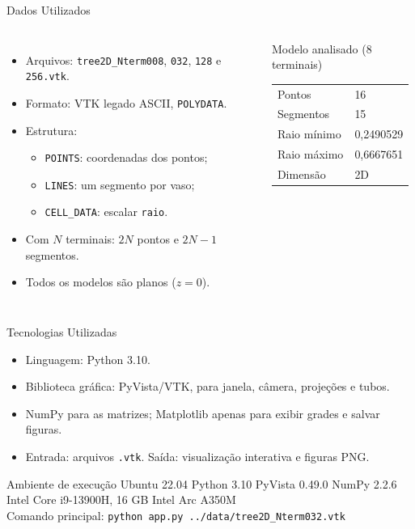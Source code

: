 \documentclass[aspectratio=169,11pt]{beamer}
\begin{document}
\begin{frame}{Dados Utilizados}
\begin{columns}
\begin{itemize}
  \item Arquivos: \texttt{tree2D\_Nterm008}, \texttt{032}, \texttt{128} e \texttt{256}\texttt{.vtk}.
  \item Formato: VTK legado ASCII, \texttt{POLYDATA}.
  \item Estrutura:
  \begin{itemize}
    \item \texttt{POINTS}: coordenadas dos pontos;
    \item \texttt{LINES}: um segmento por vaso;
    \item \texttt{CELL\_DATA}: escalar \texttt{raio}.
  \end{itemize}
  \item Com $N$ terminais: $2N$ pontos e $2N-1$ segmentos.
  \item Todos os modelos são planos ($z=0$).
\end{itemize}

\begin{block}{Modelo analisado (8 terminais)}
\small
\begin{tabular}{ll}
\toprule
Pontos & 16\\
Segmentos & 15\\
Raio mínimo & 0,2490529\\
Raio máximo & 0,6667651\\
Dimensão & 2D\\
\bottomrule
\end{tabular}
\end{block}
\end{columns}
\end{frame}

\begin{frame}{Tecnologias Utilizadas}
\begin{itemize}
  \item Linguagem: Python 3.10.
  \item Biblioteca gráfica: PyVista/VTK, para janela, câmera, projeções e tubos.
  \item NumPy para as matrizes; Matplotlib \alert{apenas} para exibir grades e salvar figuras.
  \item Entrada: arquivos \texttt{.vtk}. Saída: visualização interativa e figuras PNG.
\end{itemize}

\vspace{0.25cm}

\begin{block}{Ambiente de execução}
\small
Ubuntu 22.04 \quad Python 3.10 \quad PyVista 0.49.0 \quad NumPy 2.2.6\\
Intel Core i9-13900H, 16 GB \quad Intel Arc A350M\\[0.1cm]
Comando principal: \texttt{python app.py ../data/tree2D\_Nterm032.vtk}
\end{block}
\end{frame}
\end{document}
